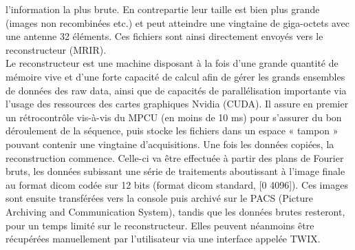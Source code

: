 {l’information la plus brute. En contrepartie leur taille est bien plus grande (images non recombinées
etc.) et peut atteindre une vingtaine de giga-octets avec une antenne 32 éléments. Ces fichiers sont
ainsi directement envoyés vers le reconstructeur (MRIR).\\
Le reconstructeur est une machine disposant à la fois d’une grande quantité de mémoire vive
et d’une forte capacité de calcul afin de gérer les grands ensembles de données des raw data, ainsi que
de capacités de parallélisation importante via l’usage des ressources des cartes graphiques Nvidia
(CUDA). Il assure en premier un rétrocontrôle vis-à-vis du MPCU (en moins de 10 ms) pour s’assurer
du bon déroulement de la séquence, puis stocke les fichiers dans un espace « tampon » pouvant
contenir une vingtaine d’acquisitions. Une fois les données copiées, la reconstruction commence.
Celle-ci va être effectuée à partir des plans de Fourier bruts, les données subissant une série de
traitements aboutissant à l’image finale au format dicom codée sur 12 bits (format dicom standard, [0
4096]). Ces images sont ensuite transférées vers la console puis archivé sur le PACS (Picture Archiving
and Communication System), tandis que les données brutes resteront, pour un temps limité sur le
reconstructeur. Elles peuvent néanmoins être récupérées manuellement par l’utilisateur via une
interface appelée TWIX.
}
